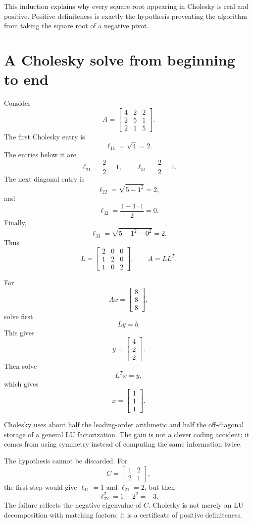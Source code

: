 This induction explains why every square root appearing in Cholesky is real and positive.  Positive definiteness is exactly the hypothesis preventing the algorithm from taking the square root of a negative pivot.

\section{A Cholesky solve from beginning to end}

Consider
\[
  A=
  \begin{bmatrix}
    4&2&2\\
    2&5&1\\
    2&1&5
  \end{bmatrix}.
\]
The first Cholesky entry is
\[
  \ell_{11}=\sqrt4=2.
\]
The entries below it are
\[
  \ell_{21}=\frac22=1,
  \qquad
  \ell_{31}=\frac22=1.
\]
The next diagonal entry is
\[
  \ell_{22}=\sqrt{5-1^2}=2,
\]
and
\[
  \ell_{32}=\frac{1-1\cdot1}{2}=0.
\]
Finally,
\[
  \ell_{33}=\sqrt{5-1^2-0^2}=2.
\]
Thus
\[
  L=
  \begin{bmatrix}
    2&0&0\\
    1&2&0\\
    1&0&2
  \end{bmatrix},
  \qquad
  A=LL^T.
\]

For
\[
  Ax=
  \begin{bmatrix}8\\8\\8\end{bmatrix},
\]
solve first
\[
  Ly=b.
\]
This gives
\[
  y=
  \begin{bmatrix}4\\2\\2\end{bmatrix}.
\]
Then solve
\[
  L^Tx=y,
\]
which gives
\[
  x=
  \begin{bmatrix}1\\1\\1\end{bmatrix}.
\]

Cholesky uses about half the leading-order arithmetic and half the off-diagonal storage of a general LU factorization.  The gain is not a clever coding accident; it comes from using symmetry instead of computing the same information twice.

The hypothesis cannot be discarded.  For
\[
  C=
  \begin{bmatrix}
    1&2\\
    2&1
  \end{bmatrix},
\]
the first step would give \(\ell_{11}=1\) and \(\ell_{21}=2\), but then
\[
  \ell_{22}^2=1-2^2=-3.
\]
The failure reflects the negative eigenvalue of \(C\).  Cholesky is not merely an LU decomposition with matching factors; it is a certificate of positive definiteness.

